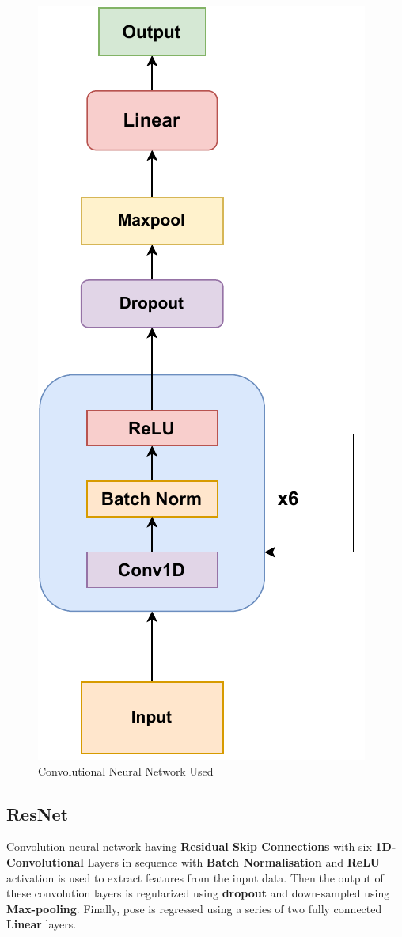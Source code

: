 \begin{figure}
    \centering
    \includegraphics{images/fig_chapter2/nns/cnn_mt.pdf}
    \caption{Convolutional Neural Network Used}
    \label{fig:cnn_used}
\end{figure}

\subsection{ResNet}
Convolution neural network having \textbf{Residual Skip Connections} with six \textbf{1D-Convolutional} Layers in sequence with \textbf{Batch Normalisation} and  \textbf{ReLU} activation is used to extract features from the input data. Then the output of these convolution layers is regularized using \textbf{dropout} and down-sampled using \textbf{Max-pooling}. Finally, pose is regressed using a series of two fully connected \textbf{Linear} layers. 

